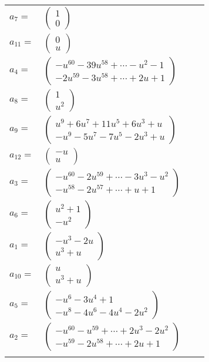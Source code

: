 \documentclass[1p]{elsarticle_modified}
\theoremstyle{definition}
\begin{document}
\begin{tabular}{m{7pt} m{180pt} m{7pt} m{180pt} }
\flushright $a_{7}=$&$\begin{pmatrix}1\\0\end{pmatrix}$ \\
\flushright $a_{11}=$&$\begin{pmatrix}0\\u\end{pmatrix}$ \\
\flushright $a_{4}=$&$\begin{pmatrix}- u^{60}-39 u^{58}+\cdots- u^2-1\\-2 u^{59}-3 u^{58}+\cdots+2 u+1\end{pmatrix}$ \\
\flushright $a_{8}=$&$\begin{pmatrix}1\\u^2\end{pmatrix}$ \\
\flushright $a_{9}=$&$\begin{pmatrix}u^9+6 u^7+11 u^5+6 u^3+u\\- u^9-5 u^7-7 u^5-2 u^3+u\end{pmatrix}$ \\
\flushright $a_{12}=$&$\begin{pmatrix}- u\\u\end{pmatrix}$ \\
\flushright $a_{3}=$&$\begin{pmatrix}- u^{60}-2 u^{59}+\cdots-3 u^3- u^2\\- u^{58}-2 u^{57}+\cdots+u+1\end{pmatrix}$ \\
\flushright $a_{6}=$&$\begin{pmatrix}u^2+1\\- u^2\end{pmatrix}$ \\
\flushright $a_{1}=$&$\begin{pmatrix}- u^3-2 u\\u^3+u\end{pmatrix}$ \\
\flushright $a_{10}=$&$\begin{pmatrix}u\\u^3+u\end{pmatrix}$ \\
\flushright $a_{5}=$&$\begin{pmatrix}- u^6-3 u^4+1\\- u^8-4 u^6-4 u^4-2 u^2\end{pmatrix}$ \\
\flushright $a_{2}=$&$\begin{pmatrix}- u^{60}- u^{59}+\cdots+2 u^3-2 u^2\\- u^{59}-2 u^{58}+\cdots+2 u+1\end{pmatrix}$\\&\end{tabular}
\end{document}
